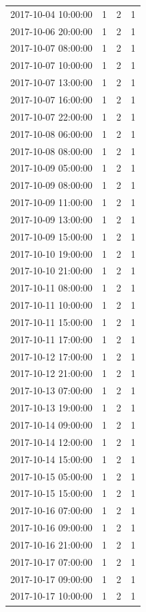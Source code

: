 \begin{tabular}{lrrr}
2017-10-04 10:00:00 & 1 & 2 & 1 \\
2017-10-06 20:00:00 & 1 & 2 & 1 \\
2017-10-07 08:00:00 & 1 & 2 & 1 \\
2017-10-07 10:00:00 & 1 & 2 & 1 \\
2017-10-07 13:00:00 & 1 & 2 & 1 \\
2017-10-07 16:00:00 & 1 & 2 & 1 \\
2017-10-07 22:00:00 & 1 & 2 & 1 \\
2017-10-08 06:00:00 & 1 & 2 & 1 \\
2017-10-08 08:00:00 & 1 & 2 & 1 \\
2017-10-09 05:00:00 & 1 & 2 & 1 \\
2017-10-09 08:00:00 & 1 & 2 & 1 \\
2017-10-09 11:00:00 & 1 & 2 & 1 \\
2017-10-09 13:00:00 & 1 & 2 & 1 \\
2017-10-09 15:00:00 & 1 & 2 & 1 \\
2017-10-10 19:00:00 & 1 & 2 & 1 \\
2017-10-10 21:00:00 & 1 & 2 & 1 \\
2017-10-11 08:00:00 & 1 & 2 & 1 \\
2017-10-11 10:00:00 & 1 & 2 & 1 \\
2017-10-11 15:00:00 & 1 & 2 & 1 \\
2017-10-11 17:00:00 & 1 & 2 & 1 \\
2017-10-12 17:00:00 & 1 & 2 & 1 \\
2017-10-12 21:00:00 & 1 & 2 & 1 \\
2017-10-13 07:00:00 & 1 & 2 & 1 \\
2017-10-13 19:00:00 & 1 & 2 & 1 \\
2017-10-14 09:00:00 & 1 & 2 & 1 \\
2017-10-14 12:00:00 & 1 & 2 & 1 \\
2017-10-14 15:00:00 & 1 & 2 & 1 \\
2017-10-15 05:00:00 & 1 & 2 & 1 \\
2017-10-15 15:00:00 & 1 & 2 & 1 \\
2017-10-16 07:00:00 & 1 & 2 & 1 \\
2017-10-16 09:00:00 & 1 & 2 & 1 \\
2017-10-16 21:00:00 & 1 & 2 & 1 \\
2017-10-17 07:00:00 & 1 & 2 & 1 \\
2017-10-17 09:00:00 & 1 & 2 & 1 \\
2017-10-17 10:00:00 & 1 & 2 & 1 \\

\end{tabular}
